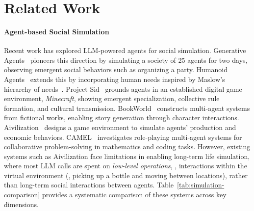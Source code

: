 
\section{Related Work}
\label{sec:related}


\paragraph{Agent-based Social Simulation}
Recent work has explored LLM-powered agents for social simulation.
Generative Agents~\citep{park2023generative} pioneers this direction by simulating a society of 25 agents for two days,
observing emergent social behaviors such as organizing a party.
Humanoid Agents~\citep{wang2023humanoid} extends this by incorporating human needs inspired by Maslow's hierarchy of needs~\citep{maslow1943theory}.
Project Sid~\citep{altera2024projectsid} grounds agents in an established digital game environment, \textit{Minecraft},
showing emergent specialization, collective rule formation, and cultural transmission.
BookWorld~\citep{ran-etal-2025-bookworld} constructs multi-agent systems from fictional works,
enabling story generation through character interactions.
Aivilization~\citep{fan2026aivilization} designs a game environment to simulate agents' production and economic behaviors.
CAMEL~\citep{li2024camel} investigates role-playing multi-agent systems for collaborative problem-solving in mathematics and coding tasks.
However, existing systems such as Aivilization face limitations in enabling long-term life simulation, where most LLM calls are spent on \textit{low-level operations}, \ie,  interactions within the virtual environment (\eg, picking up a bottle and moving between locations), rather than long-term social interactions between agents.
Table~\ref{tab:simulation-comparison} provides a systematic comparison of these systems across key dimensions.



